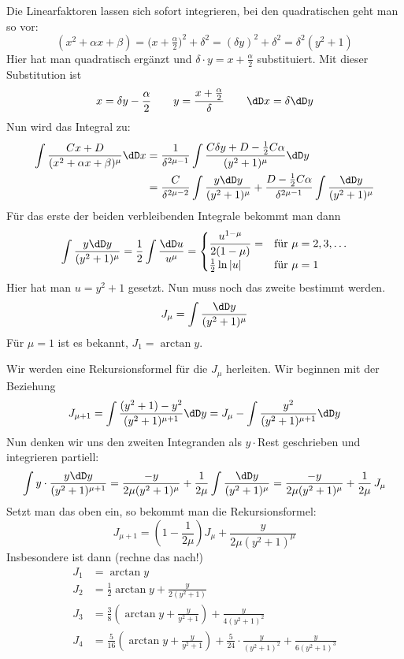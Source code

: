 \noindent Die Linearfaktoren lassen sich sofort integrieren, bei den
quadratischen geht man so vor:
\[
(x^2+\alpha x+\beta)=\bigl(x+\tfrac{\alpha}{2}\bigr)^2+\delta^2
=(\delta y)^2+\delta^2=\delta^2(y^2+1)
\]
Hier hat man quadratisch ergänzt und $\delta\cdot y=x+\frac{\alpha}{2}$
substituiert. Mit dieser Substitution ist
\[
x=\delta y-\frac{\alpha}{2}\qquad y=\frac{x+\frac{\alpha}{2}}{\delta}\qquad
\dD x=\delta\dD y
\]
Nun wird das Integral zu:
\begin{align*}
  \int\frac{Cx+D}{(x^2+\alpha x+\beta)^\mu}\dD x
  &=\frac{1}{\delta^{2\mu-1}}
  \int\frac{C\delta y+D-\frac12C\alpha}{(y^2+1)^\mu}\dD y\\
  &=\frac{C}{\delta^{2\mu-2}}\int\frac{y\dD y}{(y^2+1)^\mu}
  +\frac{D-\frac12C\alpha}{\delta^{2\mu-1}}\int\frac{\dD y}{(y^2+1)^\mu}
\end{align*}
Für das erste der beiden verbleibenden Integrale bekommt man dann
\begin{equation}
  \label{eq:70}
  \int\frac{y\dD y}{(y^2+1)^\mu}=\frac12\int\frac{\dD u}{u^\mu}=
  \begin{cases}
    \dfrac{u^{1-\mu}}{2(1-\mu)}=&\text{für~}\mu=2, 3, \dots\\
    \frac{1}{2}\ln|u|& \text{für~} \mu=1
  \end{cases}
\end{equation}
Hier hat man $u=y^2+1$ gesetzt. Nun muss noch das zweite bestimmt werden.
\[
J_\mu=\int\frac{\dD y}{(y^2+1)^\mu}
\]
Für $\mu=1$ ist es bekannt, $J_1=\arctan y$.

Wir werden eine Rekursionsformel für die $J_\mu$ herleiten. Wir beginnen mit
der Beziehung
\[
J_{\mu+1}=\int\frac{(y^2+1)-y^2}{(y^2+1)^{\mu+1}}\dD y
=J_\mu-\int\frac{y^2}{(y^2+1)^{\mu+1}}\dD y
\]
Nun denken wir uns den zweiten Integranden als $y\cdot$Rest geschrieben und
integrieren partiell:
\[
\int y\cdot\frac{y\dD y}{(y^2+1)^{\mu+1}}=
\frac{-y}{2\mu(y^2+1)^\mu}+\frac{1}{2\mu}\int\frac{\dD y}{(y^2+1)^\mu}=
\frac{-y}{2\mu(y^2+1)^\mu}+\frac{1}{2\mu}\,J_\mu
\]
Setzt man das oben ein, so bekommt man die Rekursionsformel:
\begin{equation}
  \label{eq:71}
  J_{\mu+1}=\left(1-\frac{1}{2\mu}\right)J_\mu+\frac{y}{2\mu(y^2+1)^\mu}
\end{equation}
Insbesondere ist dann (rechne das nach!)
\begin{align*}
  J_1&=\arctan y\\
  J_2&=\frac{1}{2}\arctan y+\frac{y}{2(y^2+1)}\\
  J_3&=\frac38\left(\arctan y+\frac{y}{y^2+1}\right)+\frac{y}{4(y^2+1)^2}\\
  J_4&=\frac{5}{16}\left(\arctan y+\frac{y}{y^2+1}\right)+
       \frac{5}{24}\cdot\frac{y}{(y^2+1)^2}+\frac{y}{6(y^2+1)^3}
\end{align*}

